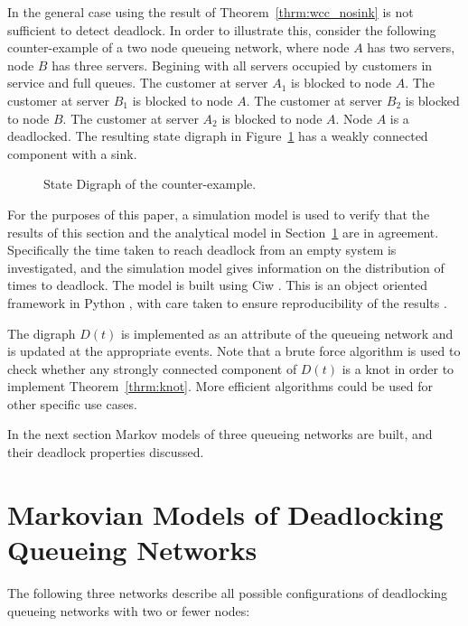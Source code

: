 \documentclass{article}
\numberwithin{equation}{section}
\begin{document}
In the general case using the result of Theorem~\ref{thrm:wcc_nosink} is not
sufficient to detect deadlock.
In order to illustrate this, consider the following counter-example of a two
node queueing network, where node $A$ has two servers, node $B$ has three
servers.
Begining with all servers occupied by customers in service and full queues.
The customer at server $A_1$ is blocked to node $A$.
The customer at server $B_1$ is blocked to node $A$.
The customer at server $B_2$ is blocked to node $B$.
The customer at server $A_2$ is blocked to node $A$.
Node $A$ is a deadlocked.
The resulting state digraph in Figure~\ref{fig:counter_example} has a weakly
connected component with a sink.

\begin{figure}
\begin{center}

\end{center}
\caption{State Digraph of the counter-example.}
\label{fig:counter_example}
\end{figure}

For the purposes of this paper, a simulation model is used to verify that the
results of this section and the analytical model in
Section~\ref{sec:markovmodels} are in agreement.
Specifically the time taken to reach deadlock from an empty system is
investigated, and the simulation model gives information on the distribution
of times to deadlock.
The model is built using Ciw \cite{ciwpython}.
This is an object oriented framework in Python \cite{python15}, with care
taken to ensure reproducibility of the results \cite{hongetal15}.

The digraph \(D(t)\) is implemented as an attribute of the queueing network
and is updated at the appropriate events.
Note that a brute force algorithm is used to check whether any strongly
connected component of $D(t)$ is a knot in order to implement
Theorem~\ref{thrm:knot}.
More efficient algorithms could be used for other specific use cases.

In the next section Markov models of three queueing networks are built, and
their deadlock properties discussed.


\section{Markovian Models of Deadlocking Queueing Networks}\label{sec:markovmodels}

The following three networks describe all possible configurations of 
deadlocking queueing networks with two or fewer nodes:
\end{document}
